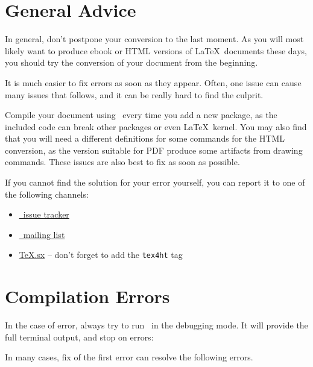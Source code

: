 
\section{General Advice}

In general, don't postpone your conversion to the last moment. As you will 
most likely want to produce ebook or HTML versions of \LaTeX\ documents these days, 
you should try the conversion of your document from the beginning. 

It is much easier to fix errors as soon as they appear. Often, one issue can
cause many issues that follows, and it can be really hard to find the culprit. 

Compile your document using \texfourht\ every time you add
a new package, as the included code can break other packages or even \LaTeX\ kernel. 
You may also find that you will need a different definitions for some commands for the HTML conversion, as the 
version suitable for PDF produce some artifacts from drawing commands. These issues are 
also best to fix as soon as possible.

If you cannot find the solution for your error yourself, you can report it to one of the following 
channels:

\begin{itemize}
  \item \href{https://puszcza.gnu.org.ua/bugs/?group=tex4ht}{\texfourht\ issue tracker} 
  \item \href{https://tug.org/mailman/listinfo/tex4ht}{\texfourht\ mailing list}
  \item \href{https://tex.stackexchange.com/questions/tagged/tex4ht}{TeX.sx} -- don't forget to add the \texttt{tex4ht} tag
\end{itemize}


\section{Compilation Errors}
\label{faq:compilation_errors}

In the case of error, always try to run \makefourht\ in the debugging mode. It will provide the full terminal output,
and stop on errors:


In many cases, fix of the first error can resolve the following errors.



